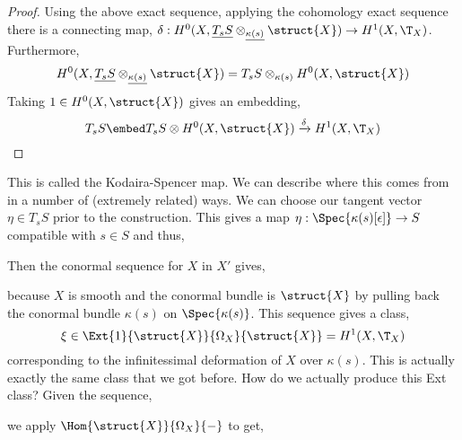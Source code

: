 \documentclass[12pt]{article}
\begin{document}
\begin{proof}
Using the above exact sequence, applying the cohomology exact sequence there is a connecting map, $\delta : H^0(X, \underline{T_s S} \otimes_{\underline{\kappa(s)}} \struct{X}) \to H^1(X, \T_{X})$. Furthermore,
\[ H^0(X, \underline{T_s S} \otimes_{\underline{\kappa(s)}} \struct{X}) = T_s S \otimes_{\kappa(s)} H^0(X, \struct{X}) \]
Taking $1 \in H^0(X, \struct{X})$ gives an embedding,
\[ T_s S \embed T_s S \otimes H^0(X, \struct{X}) \xrightarrow{\delta} H^1(X, \T_{X}) \]
\end{proof}

\begin{rmk}
This is called the Kodaira-Spencer map. We can describe where this comes from in a number of (extremely related) ways. We can choose our tangent vector $\eta \in T_s S$ prior to the construction. This gives a map $\eta : \Spec{\kappa(s)[\epsilon]} \to S$ compatible with $s \in S$ and thus,
\begin{center}
\end{center}
Then the conormal sequence for $X$ in $X'$ gives,
\begin{center}
\end{center}
because $X$ is smooth and the conormal bundle is $\struct{X}$ by pulling back the conormal bundle $\kappa(s)$ on $\Spec{\kappa(s)}$. This sequence gives a class,
\[ \xi \in \Ext{1}{\struct{X}}{\Omega_X}{\struct{X}} = H^1(X, \T_X) \]
corresponding to the infinitessimal deformation of $X$ over $\kappa(s)$. This is actually exactly the same class that we got before. How do we actually produce this Ext class? Given the sequence,
\begin{center}
\end{center}
we apply $\Hom{\struct{X}}{\Omega_X}{-}$ to get,
\begin{center}
\begin{tikzcd}

\end{tikzcd}
\end{center}
\end{rmk}
\end{document}
